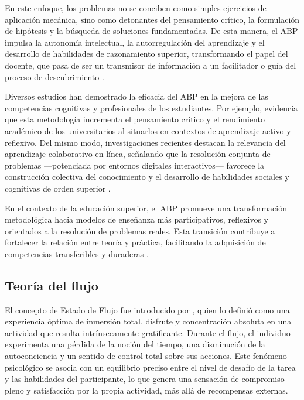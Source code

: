En este enfoque, los problemas no se conciben como simples ejercicios de aplicación mecánica, sino como detonantes del pensamiento crítico, la formulación de hipótesis y la búsqueda de soluciones fundamentadas. De esta manera, el ABP impulsa la autonomía intelectual, la autorregulación del aprendizaje y el desarrollo de habilidades de razonamiento superior, transformando el papel del docente, que pasa de ser un transmisor de información a un facilitador o guía del proceso de descubrimiento \cite{Ge_Zhu_Lin_Jiang_Li_Lu_Mi_Tung_2025}.

Diversos estudios han demostrado la eficacia del ABP en la mejora de las competencias cognitivas y profesionales de los estudiantes. Por ejemplo, \textcite{Lu_Singh_2024} evidencia que esta metodología incrementa el pensamiento crítico y el rendimiento académico de los universitarios al situarlos en contextos de aprendizaje activo y reflexivo.
Del mismo modo, investigaciones recientes destacan la relevancia del aprendizaje colaborativo en línea, señalando que la resolución conjunta de problemas —potenciada por entornos digitales interactivos— favorece la construcción colectiva del conocimiento y el desarrollo de habilidades sociales y cognitivas de orden superior \cite{Jiang_Ruan_Feng_Jiang_Xiong_2023}.

En el contexto de la educación superior, el ABP promueve una transformación metodológica hacia modelos de enseñanza más participativos, reflexivos y orientados a la resolución de problemas reales. Esta transición contribuye a fortalecer la relación entre teoría y práctica, facilitando la adquisición de competencias transferibles y duraderas \cite{ruiz-meza_application_nodate}.


\subsection{Teoría del flujo}

El concepto de Estado de Flujo fue introducido por \textcite{Csikszentmihalyi_2008}, quien lo definió como una experiencia óptima de inmersión total, disfrute y concentración absoluta en una actividad que resulta intrínsecamente gratificante. Durante el flujo, el individuo experimenta una pérdida de la noción del tiempo, una disminución de la autoconciencia y un sentido de control total sobre sus acciones. Este fenómeno psicológico se asocia con un equilibrio preciso entre el nivel de desafío de la tarea y las habilidades del participante, lo que genera una sensación de compromiso pleno y satisfacción por la propia actividad, más allá de recompensas externas.

